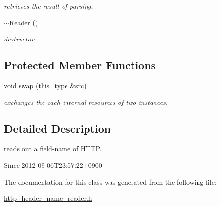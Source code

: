 \begin{DoxyCompactItemize}
\begin{DoxyCompactList}\small\item\em retrieves the result of parsing. \end{DoxyCompactList}\item 
\hypertarget{classhryky_1_1http_1_1header_1_1name_1_1_reader_a277228edf4a74245e9186c4d094749e0}{\hyperlink{classhryky_1_1http_1_1header_1_1name_1_1_reader_a277228edf4a74245e9186c4d094749e0}{$\sim$\-Reader} ()}\label{classhryky_1_1http_1_1header_1_1name_1_1_reader_a277228edf4a74245e9186c4d094749e0}

\begin{DoxyCompactList}\small\item\em destructor. \end{DoxyCompactList}\end{DoxyCompactItemize}
\subsection*{Protected Member Functions}
\begin{DoxyCompactItemize}
\item 
\hypertarget{classhryky_1_1http_1_1header_1_1name_1_1_reader_ace240efbe19d0dc6ad12d97263c35d54}{void \hyperlink{classhryky_1_1http_1_1header_1_1name_1_1_reader_ace240efbe19d0dc6ad12d97263c35d54}{swap} (\hyperlink{classhryky_1_1http_1_1header_1_1name_1_1_reader_ace8bca464723d7ca1460bd39c59fe2e6}{this\-\_\-type} \&src)}\label{classhryky_1_1http_1_1header_1_1name_1_1_reader_ace240efbe19d0dc6ad12d97263c35d54}

\begin{DoxyCompactList}\small\item\em exchanges the each internal resources of two instances. \end{DoxyCompactList}\end{DoxyCompactItemize}


\subsection{Detailed Description}
reads out a field-\/name of H\-T\-T\-P. 

\begin{DoxySince}{Since}
2012-\/09-\/06\-T23\-:57\-:22+0900 
\end{DoxySince}


The documentation for this class was generated from the following file\-:\begin{DoxyCompactItemize}
\item 
\hyperlink{http__header__name__reader_8h}{http\-\_\-header\-\_\-name\-\_\-reader.\-h}\end{DoxyCompactItemize}

